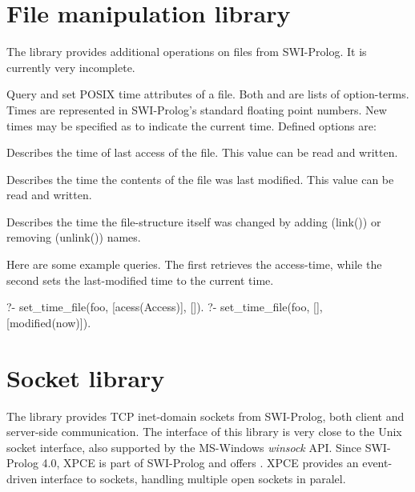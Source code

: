 \documentclass[11pt]{article}
\begin{document}
\section{File manipulation library}

The  library provides additional operations on files from
SWI-Prolog.  It is currently very incomplete.

\begin{description}
Query and set POSIX time attributes of a file.  Both 
and  are lists of option-terms.  Times are represented
in SWI-Prolog's standard floating point numbers.  New times may
be specified as  to indicate the current time.  Defined
options are:

\begin{description}
Describes the time of last access of the file.  This value can be
read and written.

Describes the time the contents of the file was last modified.
This value can be read and written.

Describes the time the file-structure itself was changed by adding
(link()) or removing (unlink()) names.
\end{description}

Here are some example queries.  The first retrieves the access-time,
while the second sets the last-modified time to the current time.

\begin{code}
?- set_time_file(foo, [acess(Access)], []).
?- set_time_file(foo, [], [modified(now)]).
\end{code}

\noindent
\end{description}

\section{Socket library}

The  library provides TCP inet-domain sockets from
SWI-Prolog, both client and server-side communication. The interface of
this library is very close to the Unix socket interface, also supported
by the MS-Windows {\em winsock} API.  Since SWI-Prolog 4.0, XPCE is part
of SWI-Prolog and offers .  XPCE provides an event-driven
interface to sockets, handling multiple open sockets in paralel.
\end{document}
